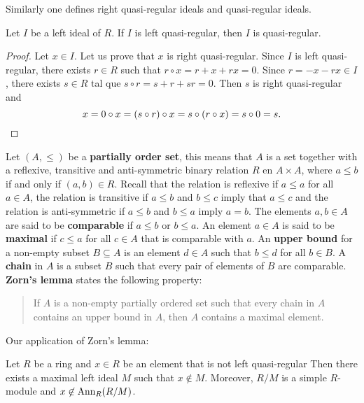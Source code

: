 Similarly 
one defines right quasi-regular ideals and quasi-regular ideals. 

\begin{lemma}
	\label{lemma:casiregular}
	Let $I$ be a left ideal of $R$. If $I$ is left quasi-regular, then 
	$I$ is quasi-regular.
\end{lemma}

\begin{proof}
	Let $x\in I$. Let us prove that $x$ is right quasi-regular. Since $I$ is
	left quasi-regular, there exists $r\in R$ such that $r\circ x=r+x+rx=0$. Since 
	$r=-x-rx\in I$, there exists $s\in R$ tal que $s\circ
	r=s+r+sr=0$. Then $s$ is right quasi-regular and  
	\[
	x=0\circ x=(s\circ r)\circ x=s\circ (r\circ x)=s\circ 0=s.\qedhere
	\]
\end{proof}

Let $(A,\leq)$ be a \textbf{partially order set}, this means that $A$ is a set together with a 
reflexive, transitive and anti-symmetric binary relation
$R$ en $A\times A$, where $a\leq b$ if and only if $(a,b)\in R$. 
Recall that the relation is reflexive if $a\leq a$ for all $a\in A$, the relation is transitive if 
$a\leq b$ and $b\leq c$ imply that 
$a\leq c$ and the relation is anti-symmetric if $a\leq b$ and $b\leq a$ imply $a=b$.
The elements $a,b\in A$ are said to be \textbf{comparable} if $a\leq b$ or $b\leq
a$. An element $a\in A$ is said to be \textbf{maximal} if 
$c\leq a$ 
for all $c\in A$
that is comparable with $a$. 
An \textbf{upper bound} for a non-empty subset $B\subseteq A$ is an element $d\in
A$ such that $b\leq d$ for all $b\in B$. A \textbf{chain} in $A$ is a subset 
$B$ such that every pair of elements of $B$ are comparable. 
\textbf{Zorn's lemma} states the following property: 
\begin{quote}
If $A$ is a non-empty partially ordered set such that every chain in 
$A$ contains an upper bound in $A$, then $A$ contains a maximal element. 
\end{quote}

Our application of Zorn's lemma:

\begin{lemma}
	\label{lemma:maxreg}
	Let $R$ be a ring and $x\in R$ be an element that is not left quasi-regular Then there
	exists a maximal left ideal $M$ such that 
	$x\not\in M$. Moreover, $R/M$ is a simple $R$-module and  
	$x\not\in\operatorname{Ann}_R(R/M)$.
\end{lemma}

